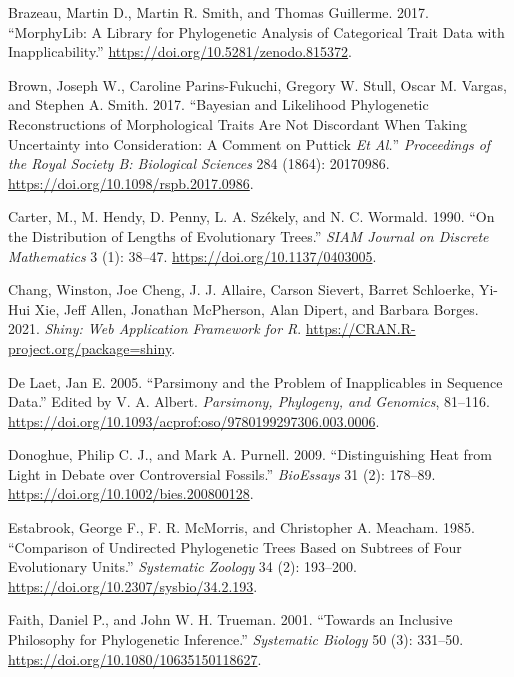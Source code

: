 \begin{CSLReferences}{1}{0}
\leavevmode{}%
Brazeau, Martin D., Martin R. Smith, and Thomas Guillerme. 2017. {``{MorphyLib}: A Library for Phylogenetic Analysis of Categorical Trait Data with Inapplicability.''} \url{https://doi.org/10.5281/zenodo.815372}.

\leavevmode{}%
Brown, Joseph W., Caroline Parins-Fukuchi, Gregory W. Stull, Oscar M. Vargas, and Stephen A. Smith. 2017. {``Bayesian and Likelihood Phylogenetic Reconstructions of Morphological Traits Are Not Discordant When Taking Uncertainty into Consideration: A Comment on {Puttick} {\emph{Et Al.}}''} \emph{Proceedings of the Royal Society B: Biological Sciences} 284 (1864): 20170986. \url{https://doi.org/10.1098/rspb.2017.0986}.

\leavevmode{}%
Carter, M., M. Hendy, D. Penny, L. A. Székely, and N. C. Wormald. 1990. {``On the Distribution of Lengths of Evolutionary Trees.''} \emph{SIAM Journal on Discrete Mathematics} 3 (1): 38--47. \url{https://doi.org/10.1137/0403005}.

\leavevmode{}%
Chang, Winston, Joe Cheng, J. J. Allaire, Carson Sievert, Barret Schloerke, Yi-Hui Xie, Jeff Allen, Jonathan McPherson, Alan Dipert, and Barbara Borges. 2021. \emph{Shiny: Web Application Framework for {R}}. \url{https://CRAN.R-project.org/package=shiny}.

\leavevmode{}%
De Laet, Jan E. 2005. {``Parsimony and the Problem of Inapplicables in Sequence Data.''} Edited by V. A. Albert. \emph{Parsimony, Phylogeny, and Genomics}, 81--116. \url{https://doi.org/10.1093/acprof:oso/9780199297306.003.0006}.

\leavevmode{}%
Donoghue, Philip C. J., and Mark A. Purnell. 2009. {``Distinguishing Heat from Light in Debate over Controversial Fossils.''} \emph{BioEssays} 31 (2): 178--89. \url{https://doi.org/10.1002/bies.200800128}.

\leavevmode{}%
Estabrook, George F., F. R. McMorris, and Christopher A. Meacham. 1985. {``Comparison of Undirected Phylogenetic Trees Based on Subtrees of Four Evolutionary Units.''} \emph{Systematic Zoology} 34 (2): 193--200. \url{https://doi.org/10.2307/sysbio/34.2.193}.

\leavevmode{}%
Faith, Daniel P., and John W. H. Trueman. 2001. {``Towards an Inclusive Philosophy for Phylogenetic Inference.''} \emph{Systematic Biology} 50 (3): 331--50. \url{https://doi.org/10.1080/10635150118627}.


\end{CSLReferences}
